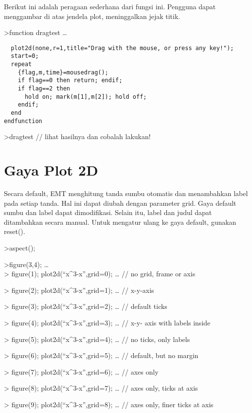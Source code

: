 \documentclass[
]{book}
\begin{document}
Berikut ini adalah peragaan sederhana dari fungsi ini. Pengguna dapat menggambar di atas jendela plot, meninggalkan jejak titik.

\textgreater function dragtest \ldots{}

\begin{verbatim}
  plot2d(none,r=1,title="Drag with the mouse, or press any key!");
  start=0;
  repeat
    {flag,m,time}=mousedrag();
    if flag==0 then return; endif;
    if flag==2 then
      hold on; mark(m[1],m[2]); hold off;
    endif;
  end
endfunction
\end{verbatim}

\textgreater dragtest // lihat hasilnya dan cobalah lakukan!

\section{Gaya Plot 2D}\label{gaya-plot-2d}

Secara default, EMT menghitung tanda sumbu otomatis dan menambahkan label pada setiap tanda. Hal ini dapat diubah dengan parameter grid. Gaya default sumbu dan label dapat dimodifikasi. Selain itu, label dan judul dapat ditambahkan secara manual. Untuk mengatur ulang ke gaya default, gunakan reset().

\textgreater aspect();

\textgreater figure(3,4); \ldots{}\\
\textgreater{} figure(1); plot2d(``x\^{}3-x'',grid=0); \ldots{} // no grid, frame or axis

\textgreater{} figure(2); plot2d(``x\^{}3-x'',grid=1); \ldots{} // x-y-axis

\textgreater{} figure(3); plot2d(``x\^{}3-x'',grid=2); \ldots{} // default ticks

\textgreater{} figure(4); plot2d(``x\^{}3-x'',grid=3); \ldots{} // x-y- axis with labels inside

\textgreater{} figure(5); plot2d(``x\^{}3-x'',grid=4); \ldots{} // no ticks, only labels

\textgreater{} figure(6); plot2d(``x\^{}3-x'',grid=5); \ldots{} // default, but no margin

\textgreater{} figure(7); plot2d(``x\^{}3-x'',grid=6); \ldots{} // axes only

\textgreater{} figure(8); plot2d(``x\^{}3-x'',grid=7); \ldots{} // axes only, ticks at axis

\textgreater{} figure(9); plot2d(``x\^{}3-x'',grid=8); \ldots{} // axes only, finer ticks at axis
\end{document}
